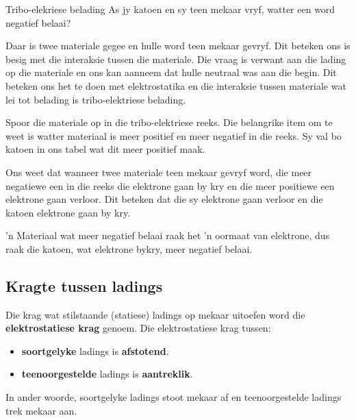 \begin{wex}{Tribo-elekriese belading}
{
As jy katoen  en sy teen mekaar vryf, watter een word negatief belaai?
}
{

Daar is twee materiale gegee en hulle word teen mekaar gevryf. Dit beteken ons is besig met die interaksie tussen die materiale. Die vraag is verwant aan die lading op die materiale en ons kan aanneem dat hulle neutraal was aan die begin. Dit beteken ons het te doen met elektrostatika en die interaksie tussen materiale wat lei tot belading is tribo-elektriese belading.



Spoor die materiale op in die tribo-elektriese reeks. Die belangrike item om te weet is watter materiaal is meer positief en meer negatief in die reeks. Sy val bo katoen in ons tabel wat dit meer positief maak.

Ons weet dat wanneer twee materiale teen mekaar gevryf word, die meer negatiewe een in die reeks die elektrone gaan by kry en die meer positiewe een elektrone gaan verloor. Dit beteken dat die sy elektrone gaan verloor en die katoen elektrone gaan by kry.
\par
'n Materiaal wat meer negatief belaai raak het 'n oormaat van elektrone, dus raak die katoen, wat elektrone bykry, meer negatief belaai.
}\end{wex}

\subsection{Kragte tussen ladings}
            \nopagebreak

Die krag wat stilstaande (statiese) ladings op mekaar uitoefen word die \textbf{elektrostatiese krag} genoem. Die elektrostatiese krag tussen:

\begin{itemize}[noitemsep]
\item \textbf{soortgelyke} ladings is \textbf{afstotend}.
\item \textbf{teenoorgestelde} ladings is \textbf{aantreklik}.
\end{itemize}

In ander woorde, soortgelyke ladings stoot mekaar af en teenoorgestelde ladings trek mekaar aan.


